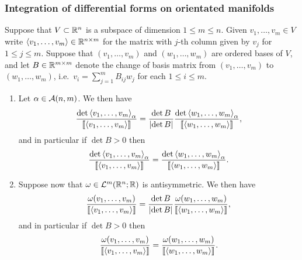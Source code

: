 \documentclass[a4paper]{article}
\begin{document}
\subsubsection{Integration of differential forms on
  orientated manifolds}

\begin{lemma}
  Suppose that $V \subset \mathbb{R}^n$ is a subspace of dimension $1\leq m \leq
    n$. Given $v_1,\dots,v_m \in V$ write $\left\langle v_1,\dots,v_m \right\rangle \in \mathbb{R}^{n
      \times m}$ for the matrix with $j$-th column given by $v_j$ for $1 \leq
    j \leq m$. Suppose that $(v_1,\dots,v_m)$ and $(w_1,\dots,w_m)$ are
  ordered bases of $V$, and let $B \in \mathbb{R}^{m \times m}$ denote the change
  of basis matrix from $(v_1,\dots,v_m)$ to $(w_1,\dots,w_m)$, i.e.\ $v_i
    = \sum_{j=1}^m B_{ij} w_j$ for each $1 \leq i \leq m$.

  \begin{enumerate}
    \item Let $\alpha \in \mathcal{A}(n,m)$. We then have
          \[
            \frac{\det \left\langle v_1,\dots,v_m \right\rangle_\alpha }
            {\left\llbracket \left\langle v_1,\dots,v_m \right\rangle \right\rrbracket }
            = \frac{\det B}{\left\lvert \det B\right\rvert}
            \frac{\det \left\langle w_1,\dots,w_m \right\rangle_\alpha }
            {\left\llbracket \left\langle w_1,\dots,w_m \right\rangle \right\rrbracket },
          \]
          and in particular if $\det B >0$ then
          \[
            \frac{\det \left\langle v_1,\dots,v_m \right\rangle_\alpha }
            {\left\llbracket \left\langle v_1,\dots,v_m \right\rangle \right\rrbracket }
            = \frac{\det \left\langle w_1,\dots,w_m \right\rangle_\alpha }
            {\left\llbracket \left\langle w_1,\dots,w_m \right\rangle \right\rrbracket }.
          \]

    \item Suppose now that $\omega \in \mathcal{L}^m(\mathbb{R}^n;\mathbb{R})$ is antisymmetric. We
          then have
          \[
            \frac{\omega(v_1,\dots,v_m)}{\left\llbracket \left\langle v_1,\dots,v_m \right\rangle \right\rrbracket }
            = \frac{\det B}{\left\lvert \det B\right\rvert} \frac{\omega(w_1,\dots,w_m)}
            {\left\llbracket \left\langle w_1,\dots,w_m \right\rangle \right\rrbracket},
          \]
          and in particular if $\det B > 0$ then
          \[
            \frac{\omega(v_1,\dots,v_m)}{\left\llbracket \left\langle v_1,\dots,v_m \right\rangle \right\rrbracket}
            = \frac{\omega(w_1,\dots,w_m)}{\left\llbracket \left\langle w_1,\dots,w_m \right\rangle \right\rrbracket}.
          \]
  \end{enumerate}
\end{lemma}
\end{document}

